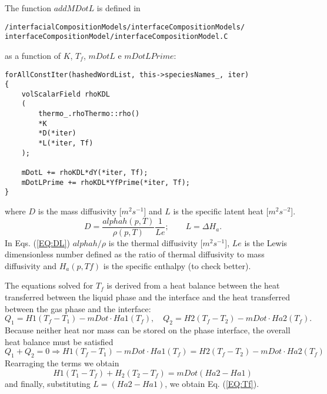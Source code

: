 \documentclass[]{report}
\begin{document}
The function $addMDotL$ is defined in 
\begin{verbatim}
/interfacialCompositionModels/interfaceCompositionModels/
interfaceCompositionModel/interfaceCompositionModel.C
\end{verbatim}
as a function of $K$, $T_f$, $mDotL$ e $mDotLPrime$:
\begin{verbatim}
forAllConstIter(hashedWordList, this->speciesNames_, iter)
{
    volScalarField rhoKDL
    (
		thermo_.rhoThermo::rho()
		*K
		*D(*iter)
		*L(*iter, Tf)
	);

	mDotL += rhoKDL*dY(*iter, Tf);
	mDotLPrime += rhoKDL*YfPrime(*iter, Tf);
}
\end{verbatim}
where $D$ is the mass diffusivity [$m^2 s^{-1}$] and $L$ is the specific latent heat [$m^2 s^{-2}$].
\begin{equation}\label{EQ:DL}
D=\frac{alphah(p,T)}{\rho(p,T)}\frac{1}{Le}; \qquad  L=\Delta H_a.
\end{equation}
In Eqs. (\ref{EQ:DL}) $alphah/\rho$ is the thermal diffusivity [$m^{2}s^{-1}$], $Le$ is the Lewis dimensionless number defined as the ratio of thermal diffusivity to mass diffusivity and $H_a(p,Tf)$ is the specific enthalpy (to check better).

The equations solved for $T_f$ is derived from a heat balance between the heat transferred between the liquid phase and the interface and the heat transferred between the gas phase and the interface:
\begin{equation}
Q_1 = H1(T_f-T_1)-mDot\cdot Ha1(T_f),\quad Q_2 = H2(T_f-T_2)-mDot\cdot Ha2(T_f).
\end{equation}
Because neither heat nor mass can be stored on the phase interface, the overall heat balance must be satisfied
\begin{equation}
Q_1+Q_2=0 \Rightarrow  H1(T_f-T_1)-mDot\cdot Ha1(T_f) =  H2(T_f-T_2)-mDot\cdot Ha2(T_f)
\end{equation}
Rearraging the terms we obtain 
\begin{equation}
H1(T_1-T_f)+H_2(T_2-T_f)=mDot(Ha2-Ha1)
\end{equation}
and finally, substituting $L=(Ha2-Ha1)$, we obtain Eq. (\ref{EQ:Tf}).
\end{document}
